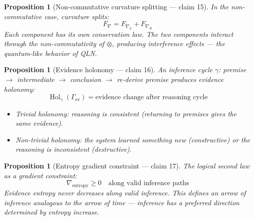 \documentclass[11pt,a4paper]{article}
\newtheorem{proposition}[definition]{Proposition}
\begin{document}
\begin{proposition}[Non-commutative curvature splitting --- claim 15]
\label{prop:split}
In the non-commutative case, curvature splits:
\[
  F_\nabla = F_{\nabla_L} + F_{\nabla_R}
\]
Each component has its own conservation law. The two components interact
through the non-commutativity of $\otimes$, producing interference
effects --- the quantum-like behavior of QLN.
\end{proposition}

\begin{proposition}[Evidence holonomy --- claim 16]
\label{prop:holonomy}
An inference cycle $\gamma$: premise $\to$ intermediate $\to$
conclusion $\to$ re-derive premise produces evidence holonomy:
\[
  \operatorname{Hol}_\gamma(\Gamma_{\text{ev}}) = \text{evidence change
    after reasoning cycle}
\]
\begin{itemize}
  \item Trivial holonomy: reasoning is consistent (returning to premises
    gives the same evidence).
  \item Non-trivial holonomy: the system learned something new
    (constructive) or the reasoning is inconsistent (destructive).
\end{itemize}
\end{proposition}

\begin{proposition}[Entropy gradient constraint --- claim 17]
\label{prop:entropy_grad}
The logical second law as a gradient constraint:
\[
  \nabla_{\text{entropy}} \geq 0 \quad \text{along valid inference paths}
\]
Evidence entropy never decreases along valid inference. This defines
an arrow of inference analogous to the arrow of time --- inference
has a preferred direction determined by entropy increase.
\end{proposition}
\end{document}
